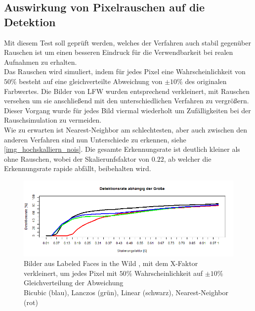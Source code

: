 \subsection{Auswirkung von Pixelrauschen auf die Detektion}
Mit diesem Test soll geprüft werden, welches der Verfahren auch stabil gegenüber Rauschen ist um einen besseren Eindruck für die Verwendbarkeit bei realen Aufnahmen zu erhalten.\\
Das Rauschen wird simuliert, indem für jedes Pixel eine Wahrscheinlichkeit von $50\%$ besteht auf eine gleichverteilte Abweichung von $\pm 10\%$ des originalen Farbwertes. Die Bilder von LFW \cite{database_Face} wurden entsprechend verkleinert, mit Rauschen versehen um sie anschließend mit den unterschiedlichen Verfahren zu vergrößern. Dieser Vorgang wurde für jedes Bild viermal wiederholt um Zufälligkeiten bei der Rauschsimulation zu vermeiden.\\
Wie zu erwarten ist Nearest-Neighbor am schlechtesten, aber auch zwischen den anderen Verfahren sind nun Unterschiede zu erkennen, siehe \autoref{img_hochskalliern_nois}. Die gesamte Erkennungsrate ist deutlich kleiner als ohne Rauschen, wobei der Skalierunfsfaktor von $0.22$, ab welcher die Erkennungsrate rapide abfällt, beibehalten wird.
\begin{figure}
	\centering
	\includegraphics[width=\linewidth]{img_Skalierung/Hochskalliern_Nois}
	\caption{Bilder aus Labeled Faces in the Wild \cite{database_Face}, mit dem X-Faktor verkleinert, um jedes Pixel mit $50\%$ Wahrscheinlichkeit auf $\pm 10\%$ Gleichverteilung der Abweichung\\Bicubic (blau), Lanczos (grün), Linear (schwarz), Nearest-Neighbor (rot)}
	\label{img_hochskalliern_nois}
\end{figure}

